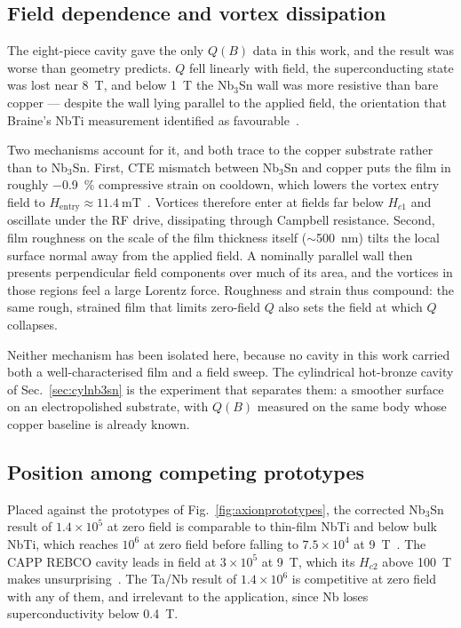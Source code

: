 \subsection{Field dependence and vortex dissipation}\label{sec:discussion_field}

The eight-piece cavity gave the only $Q(B)$ data in this work, and the result was worse than geometry predicts. $Q$ fell linearly with field, the superconducting state was lost near \qty{8}{\tesla}, and below \qty{1}{\tesla} the Nb$_3$Sn wall was more resistive than bare copper --- despite the wall lying parallel to the applied field, the orientation that Braine's NbTi measurement identified as favourable~\cite{Braine:2024nzi}.

Two mechanisms account for it, and both trace to the copper substrate rather than to Nb$_3$Sn. First, CTE mismatch between Nb$_3$Sn and copper puts the film in roughly \qty{-0.9}{\percent} compressive strain on cooldown, which lowers the vortex entry field to $H_\text{entry} \approx \qty{11.4}{\milli\tesla}$~\cite{luImpactCuSn2025}. Vortices therefore enter at fields far below $H_{c1}$ and oscillate under the RF drive, dissipating through Campbell resistance. Second, film roughness on the scale of the film thickness itself ($\sim$\qty{500}{\nano\meter}) tilts the local surface normal away from the applied field. A nominally parallel wall then presents perpendicular field components over much of its area, and the vortices in those regions feel a large Lorentz force. Roughness and strain thus compound: the same rough, strained film that limits zero-field $Q$ also sets the field at which $Q$ collapses.

Neither mechanism has been isolated here, because no cavity in this work carried both a well-characterised film and a field sweep. The cylindrical hot-bronze cavity of Sec.~\ref{sec:cylnb3sn} is the experiment that separates them: a smoother surface on an electropolished substrate, with $Q(B)$ measured on the same body whose copper baseline is already known.

\subsection{Position among competing prototypes}

Placed against the prototypes of Fig.~\ref{fig:axionprototypes}, the corrected Nb$_3$Sn result of $1.4\times10^{5}$ at zero field is comparable to thin-film NbTi and below bulk NbTi, which reaches $10^{6}$ at zero field before falling to $7.5\times10^{4}$ at \qty{9}{\tesla}~\cite{Braine:2022qal}. The CAPP REBCO cavity leads in field at $3\times10^{5}$ at \qty{9}{\tesla}, which its $H_{c2}$ above \qty{100}{\tesla} makes unsurprising~\cite{ahnSuperconductingCavityHigh2020}. The Ta/Nb result of $1.4\times10^{6}$ is competitive at zero field with any of them, and irrelevant to the application, since Nb loses superconductivity below \qty{0.4}{\tesla}.

